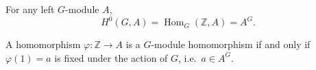For any left $G$-module $A$,
$$H^0(G, A) = \operatorname{Hom}_G(\mathbb{Z}, A) = A^G.$$

A homomorphism $\varphi: \mathbb{Z} \to A$ is a $G$-module homomorphism if and only if $\varphi(1) = a$ is fixed under the action of $G$, i.e.\ $a \in A^G$.

